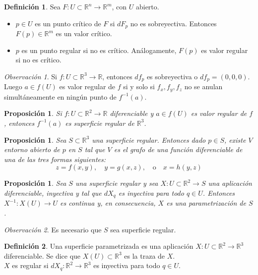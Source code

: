 \documentclass{report}
\newtheorem{proposition}[theorem]{Proposición}
\theoremstyle{remark}
\newtheorem*{remark}{Observación}
\theoremstyle{remark}
\theoremstyle{definition}
\newtheorem{definition}{Definición}[chapter]
\theoremstyle{definition}
\theoremstyle{definition}
\begin{document}
\begin{definition}
    Sea $F : U \subset \mathbb{R}^n \to \mathbb{R}^m$, con $U$ abierto.
    \begin{itemize}
        \item $p \in U$ es un punto crítico de $F$ si $dF_p$ no es sobreyectiva. Entonces $F(p) \in \mathbb{R}^m$ es un valor crítico.
        \item $p$ es un punto regular si no es crítico. Análogamente, $F(p)$ es valor regular si no es crítico.
    \end{itemize}
\end{definition}

\begin{remark}
    Si $f : U \subset \mathbb{R}^3 \to \mathbb{R}$, entonces $df_p$ es sobreyectiva o $df_p = (0,0,0)$.
    Luego $a \in f(U)$ es valor regular de $f$ si y solo si $f_x, f_y, f_z$ no se anulan simultáneamente en ningún punto de $f^{-1}(a)$.
\end{remark}

\begin{proposition}
    Si $f: U \subset \mathbb{R}^2 \to \mathbb{R}$ diferenciable y $a \in f(U)$ es valor regular de $f$, entonces $f^{-1}(a)$ es superficie regular de $\mathbb{R}^3$.
\end{proposition}

\begin{proposition}
    Sea $S \subset \mathbb{R}^3$ una superficie regular.
    Entonces dado $p \in S$, existe $V$ entorno abierto de $p$ en $S$ tal que $V$ es el grafo de una función diferenciable de una de las tres formas siguientes:
    $$z = f(x, y), \quad y = g(x, z), \quad \text{o} \quad x = h(y, z)$$
\end{proposition}

\begin{proposition}
    Sea $S$ una superficie regular y sea $X : U \subset \mathbb{R}^2 \to S$ una aplicación diferenciable, inyectiva y tal que $dX_q$ es inyectiva para todo $q \in U$.
    Entonces $X^{-1} : X(U) \to U$ es continua y, en consecuencia, $X$ es una parametrización de $S$.
\end{proposition}

\begin{remark}
    Es necesario que $S$ sea superficie regular.
\end{remark}

\begin{definition}
    Una superficie parametrizada es una aplicación $X : U \subset \mathbb{R}^2 \to \mathbb{R}^3$ diferenciable.
    Se dice que $X(U) \subset \mathbb{R}^3$ es la traza de $X$.\\
    $X$ es regular si $dX_q : \mathbb{R}^2 \to \mathbb{R}^3$ es inyectiva para todo $q \in U$.
\end{definition}
\end{document}

